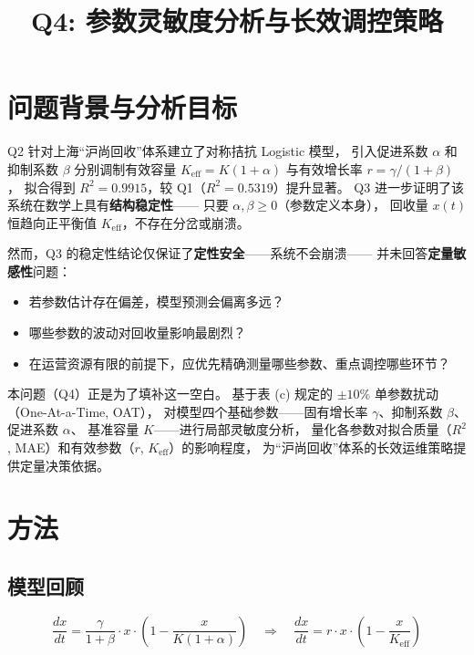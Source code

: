 \documentclass[12pt,a4paper]{article}
\title{Q4: 参数灵敏度分析与长效调控策略}
\author{}
\date{}
\begin{document}
\maketitle

\section{问题背景与分析目标}

Q2 针对上海``沪尚回收''体系建立了对称拮抗 Logistic 模型，
引入促进系数 $\alpha$ 和抑制系数 $\beta$ 分别调制有效容量 $K_{\text{eff}} = K(1+\alpha)$
与有效增长率 $r = \gamma/(1+\beta)$，
拟合得到 $R^2 = 0.9915$，较 Q1（$R^2 = 0.5319$）提升显著。
Q3 进一步证明了该系统在数学上具有\textbf{结构稳定性}——
只要 $\alpha, \beta \geq 0$（参数定义本身），
回收量 $x(t)$ 恒趋向正平衡值 $K_{\text{eff}}$，不存在分岔或崩溃。

然而，Q3 的稳定性结论仅保证了\textbf{定性安全}——系统不会崩溃——
并未回答\textbf{定量敏感性}问题：
\begin{itemize}
  \item 若参数估计存在偏差，模型预测会偏离多远？
  \item 哪些参数的波动对回收量影响最剧烈？
  \item 在运营资源有限的前提下，应优先精确测量哪些参数、重点调控哪些环节？
\end{itemize}

本问题（Q4）正是为了填补这一空白。
基于表 (c) 规定的 $\pm 10\%$ 单参数扰动（One-At-a-Time, OAT），
对模型四个基础参数——固有增长率 $\gamma$、抑制系数 $\beta$、促进系数 $\alpha$、
基准容量 $K$——进行局部灵敏度分析，
量化各参数对拟合质量（$R^2$, MAE）和有效参数（$r$, $K_{\text{eff}}$）的影响程度，
为``沪尚回收''体系的长效运维策略提供定量决策依据。

\section{方法}

\subsection{模型回顾}

\begin{equation}\label{eq:ode}
\frac{dx}{dt} = \frac{\gamma}{1+\beta} \cdot x \cdot \left(1 - \frac{x}{K(1+\alpha)}\right)
\quad\Rightarrow\quad
\frac{dx}{dt} = r \cdot x \cdot \left(1 - \frac{x}{K_{\text{eff}}}\right)
\end{equation}
\end{document}

